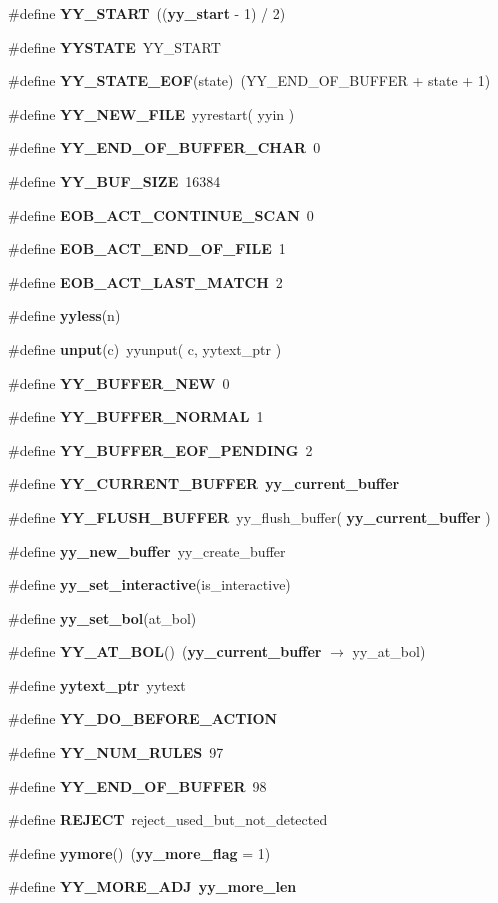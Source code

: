 \begin{CompactItemize}
\#define {\bf YY\_\-START}\ (({\bf yy\_\-start} - 1) / 2)
\item 
\#define {\bf YYSTATE}\ YY\_\-START
\item 
\#define {\bf YY\_\-STATE\_\-EOF}(state)\ (YY\_\-END\_\-OF\_\-BUFFER + state + 1)
\item 
\#define {\bf YY\_\-NEW\_\-FILE}\ yyrestart( yyin )
\item 
\#define {\bf YY\_\-END\_\-OF\_\-BUFFER\_\-CHAR}\ 0
\item 
\#define {\bf YY\_\-BUF\_\-SIZE}\ 16384
\item 
\#define {\bf EOB\_\-ACT\_\-CONTINUE\_\-SCAN}\ 0
\item 
\#define {\bf EOB\_\-ACT\_\-END\_\-OF\_\-FILE}\ 1
\item 
\#define {\bf EOB\_\-ACT\_\-LAST\_\-MATCH}\ 2
\item 
\#define {\bf yyless}(n)
\item 
\#define {\bf unput}(c)\ yyunput( c, yytext\_\-ptr )
\item 
\#define {\bf YY\_\-BUFFER\_\-NEW}\ 0
\item 
\#define {\bf YY\_\-BUFFER\_\-NORMAL}\ 1
\item 
\#define {\bf YY\_\-BUFFER\_\-EOF\_\-PENDING}\ 2
\item 
\#define {\bf YY\_\-CURRENT\_\-BUFFER}\ {\bf yy\_\-current\_\-buffer}
\item 
\#define {\bf YY\_\-FLUSH\_\-BUFFER}\ yy\_\-flush\_\-buffer( {\bf yy\_\-current\_\-buffer} )
\item 
\#define {\bf yy\_\-new\_\-buffer}\ yy\_\-create\_\-buffer
\item 
\#define {\bf yy\_\-set\_\-interactive}(is\_\-interactive)
\item 
\#define {\bf yy\_\-set\_\-bol}(at\_\-bol)
\item 
\#define {\bf YY\_\-AT\_\-BOL}()\ ({\bf yy\_\-current\_\-buffer} $\rightarrow$ yy\_\-at\_\-bol)
\item 
\#define {\bf yytext\_\-ptr}\ yytext
\item 
\#define {\bf YY\_\-DO\_\-BEFORE\_\-ACTION}
\item 
\#define {\bf YY\_\-NUM\_\-RULES}\ 97
\item 
\#define {\bf YY\_\-END\_\-OF\_\-BUFFER}\ 98
\item 
\#define {\bf REJECT}\ reject\_\-used\_\-but\_\-not\_\-detected
\item 
\#define {\bf yymore}()\ ({\bf yy\_\-more\_\-flag} = 1)
\item 
\#define {\bf YY\_\-MORE\_\-ADJ}\ {\bf yy\_\-more\_\-len}

\end{CompactItemize}
